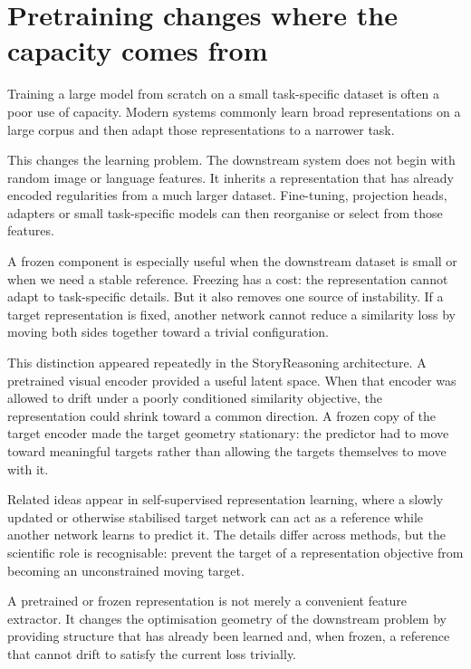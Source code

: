 \section{Pretraining changes where the capacity comes from}

Training a large model from scratch on a small task-specific dataset is often a poor use of capacity. Modern systems commonly learn broad representations on a large corpus and then adapt those representations to a narrower task.

This changes the learning problem. The downstream system does not begin with random image or language features. It inherits a representation that has already encoded regularities from a much larger dataset. Fine-tuning, projection heads, adapters or small task-specific models can then reorganise or select from those features.

A frozen component is especially useful when the downstream dataset is small or when we need a stable reference. Freezing has a cost: the representation cannot adapt to task-specific details. But it also removes one source of instability. If a target representation is fixed, another network cannot reduce a similarity loss by moving both sides together toward a trivial configuration.

This distinction appeared repeatedly in the StoryReasoning architecture. A pretrained visual encoder provided a useful latent space. When that encoder was allowed to drift under a poorly conditioned similarity objective, the representation could shrink toward a common direction. A frozen copy of the target encoder made the target geometry stationary: the predictor had to move toward meaningful targets rather than allowing the targets themselves to move with it.

Related ideas appear in self-supervised representation learning, where a slowly updated or otherwise stabilised target network can act as a reference while another network learns to predict it. The details differ across methods, but the scientific role is recognisable: prevent the target of a representation objective from becoming an unconstrained moving target.

\begin{keyidea}
A pretrained or frozen representation is not merely a convenient feature extractor. It changes the optimisation geometry of the downstream problem by providing structure that has already been learned and, when frozen, a reference that cannot drift to satisfy the current loss trivially.
\end{keyidea}

